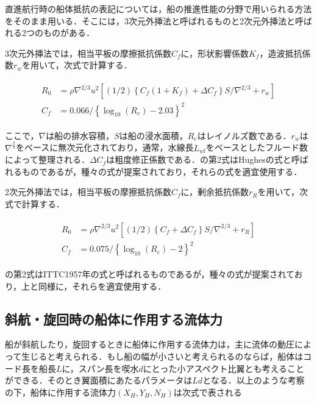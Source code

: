 直進航行時の船体抵抗の表記については，船の推進性能の分野で用いられる方法をそのまま用いる．そこには，3次元外挿法と呼ばれるものと2次元外挿法と呼ばれる2つのものがある．

3次元外挿法では，相当平板の摩擦抵抗係数$C_f$に，形状影響係数$K_f$，造波抵抗係数$r_w$を用いて，次式で計算する．

\begin{align}
    \begin{split}
        R_{0}&=\rho \nabla^{2 / 3} u^{2}\left[(1 / 2)\left\{C_{f}\left(1+K_{f}\right)+\Delta C_{f}\right\} S / \nabla^{2 / 3}+r_{w}\right] \\
        C_{f}&=0.066 /\left\{\log _{10}\left(R_{e}\right)-2.03\right\}^{2} \label{eq:2-24}
    \end{split}
\end{align}

ここで，$\nabla$は船の排水容積，$S$は船の浸水面積，$R_e$はレイノルズ数である．$r_w$は$\nabla^{\frac{2}{3}}$をベースに無次元化されており，通常，水線長$L_{wl}$をベースとしたフルード数によって整理される．$\Delta C_f$は粗度修正係数である．の第2式はHughesの式と呼ばれるものであるが，種々の式が提案されており，それらの式を適宜使用する．

2次元外挿法では，相当平板の摩擦抵抗係数$C_f$に，剰余抵抗係数$r_R$を用いて，次式で計算する．


\begin{align}
    \begin{split}
        R_{0}&=\rho \nabla^{2 / 3} u^{2}\left[(1 / 2)\left\{C_{f} +\Delta C_{f}\right\} S / \nabla^{2 / 3}+r_{R}\right] \\
        C_{f}&=0.075 /\left\{\log _{10}\left(R_{e}\right)-2\right\}^{2} \label{eq:2-25}
    \end{split}
\end{align}

の第2式はITTC1957年の式と呼ばれるものであるが，種々の式が提案されており，上と同様に，それらを適宜使用する．

\subsection{斜航・旋回時の船体に作用する流体力}

船が斜航したり，旋回するときに船体に作用する流体力は，主に流体の動圧によって生じると考えられる．もし船の幅が小さいと考えられるのならば，船体はコード長を船長$L$に，スパン長を喫水$d$にとった小アスペクト比翼とも考えることができる．そのとき翼面積にあたるパラメータは$L d$となる．以上のような考察の下，船体に作用する流体力$(X_H,Y_H,N_H )$は次式で表される


